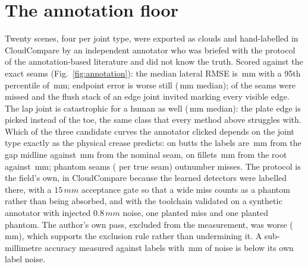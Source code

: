 \documentclass[letterpaper, 10 pt, conference]{ieeeconf}
\newcommand{\mm}{\,mm}
\begin{document}
\begin{table}[t]
\caption{Task 2: selection rate of the most probable seam and median RMSE (mm) on the matched seam, per joint type.}
\label{tab:task2}
\centering\scriptsize

\end{table}

\begin{table}[t]
\caption{The fixture price: paired twins with and without the clamping plate in view (medians over pairs).}
\label{tab:fixture}
\centering\footnotesize

\end{table}



\section{The annotation floor}\label{sec:annotation}

Twenty scenes, four per joint type, were exported as clouds and hand-labelled in CloudCompare by an independent annotator who was briefed with the protocol of the annotation-based literature and did not know the truth. Scored against the exact seams (Fig.~\ref{fig:annotation}): the median lateral RMSE is \annMedian\mm{} with a 95th percentile of \annPninetyfive\mm; endpoint error is worse still (\annEnd\mm{} median); \annMiss{} of the seams were missed and the flush stack of an edge joint invited marking every visible edge. The lap joint is catastrophic for a human as well (\annLap\mm{} median): the plate edge is picked instead of the toe, the same class that every method above struggles with. Which of the three candidate curves the annotator clicked depends on the joint type exactly as the physical crease predicts: on butts the labels are \annButtGapmid\mm{} from the gap midline against \annButtNominal\mm{} from the nominal seam, on fillets \annTRoot\mm{} from the root against \annTNominal\mm{}; phantom seams (\annExtra{} per true seam) outnumber misses. The protocol is the field's own, in CloudCompare because the learned detectors were labelled there, with a $15\mm$ acceptance gate so that a wide miss counts as a phantom rather than being absorbed, and with the toolchain validated on a synthetic annotator with injected $0.8\mm$ noise, one planted miss and one planted phantom. The author's own pass, excluded from the measurement, was worse (\annOwner\mm), which supports the exclusion rule rather than undermining it. A sub-millimetre accuracy measured against labels with \annMedian\mm{} of noise is below its own label noise.
\end{document}
